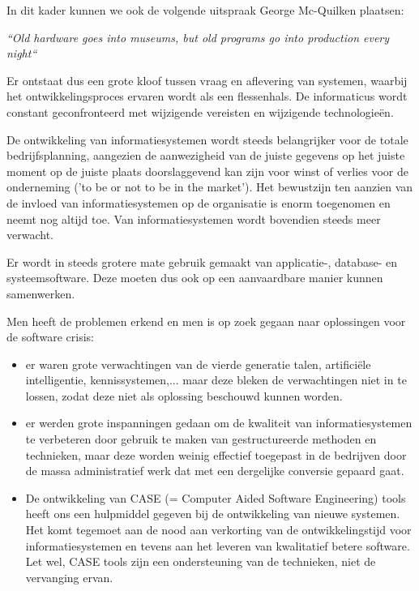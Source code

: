 In dit kader kunnen we ook de volgende uitspraak George Mc-Quilken plaatsen:
\begin{center}
\textit{\textquotedblleft Old hardware goes into museums, but old programs go into production every night\textquotedblleft}
\end{center}

Er ontstaat dus een grote kloof tussen vraag en aflevering van systemen, waarbij het ontwikkelingsproces ervaren wordt als een flessenhals. De informaticus wordt constant geconfronteerd met wijzigende vereisten en wijzigende technologieën.


De ontwikkeling van informatiesystemen wordt steeds belangrijker voor de totale bedrijfsplanning, aangezien de aanwezigheid van de juiste gegevens op het juiste moment op de juiste plaats doorslaggevend kan zijn voor winst of verlies voor de onderneming ('to be or not to be in the market').
Het bewustzijn ten aanzien van de invloed van informatiesystemen op de organisatie is enorm toegenomen en neemt nog altijd toe. Van informatiesystemen wordt bovendien steeds meer verwacht.

Er wordt in steeds grotere mate gebruik gemaakt van applicatie-, database- en systeemsoftware. Deze moeten dus ook op een aanvaardbare manier kunnen samenwerken.

Men heeft de problemen erkend en men is op zoek gegaan naar oplossingen voor de software crisis:

\begin{itemize}
    \item er waren grote verwachtingen van de vierde generatie talen, artificiële intelligentie, kennissystemen,... maar deze bleken de verwachtingen niet in te lossen, zodat deze niet als oplossing beschouwd kunnen worden.
    \item er werden grote inspanningen gedaan om de kwaliteit van informatiesystemen te verbeteren door gebruik te maken van gestructureerde methoden en technieken, maar deze worden weinig effectief toegepast in de bedrijven door de massa administratief werk dat met een dergelijke conversie gepaard gaat.
    \item De ontwikkeling van CASE (= Computer Aided Software Engineering) tools heeft ons een hulpmiddel gegeven bij de ontwikkeling van nieuwe systemen. Het komt tegemoet aan de nood aan verkorting van de
ontwikkelingstijd voor informatiesystemen en tevens aan het leveren van kwalitatief betere software. Let wel, CASE tools zijn een ondersteuning van de technieken, niet de vervanging ervan.
\end{itemize}

